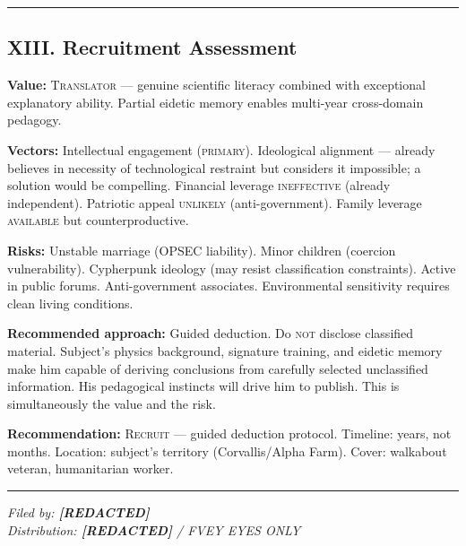 \vspace{1cm}\hrule\vspace{1cm}

\subsection*{XIII. Recruitment Assessment}
\label{record:tgt-recruitment-assessment}

\textbf{Value:} \textsc{Translator} --- genuine scientific literacy combined with exceptional explanatory ability. Partial eidetic memory enables multi-year cross-domain pedagogy.

\textbf{Vectors:} Intellectual engagement (\textsc{primary}). Ideological alignment --- already believes in necessity of technological restraint but considers it impossible; a solution would be compelling. Financial leverage \textsc{ineffective} (already independent). Patriotic appeal \textsc{unlikely} (anti-government). Family leverage \textsc{available} but counterproductive.

\textbf{Risks:} Unstable marriage (OPSEC liability). Minor children (coercion vulnerability). Cypherpunk ideology (may resist classification constraints). Active in public forums. Anti-government associates. Environmental sensitivity requires clean living conditions.

\textbf{Recommended approach:} Guided deduction. Do \textsc{not} disclose classified material. Subject's physics background, signature training, and eidetic memory make him capable of deriving conclusions from carefully selected unclassified information. His pedagogical instincts will drive him to publish. This is simultaneously the value and the risk.

\textbf{Recommendation:} \textsc{Recruit} --- guided deduction protocol. Timeline: years, not months. Location: subject's territory (Corvallis/Alpha Farm). Cover: walkabout veteran, humanitarian worker.

\vspace{1cm}\hrule\vspace{0.5cm}

\begin{flushright}\small\textit{%
Filed by: \textbf{[REDACTED]}\\
Distribution: \textbf{[REDACTED]} / FVEY EYES ONLY%
}\end{flushright}

\chapterreturn
